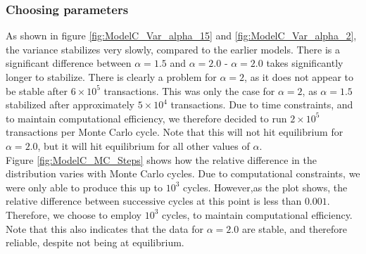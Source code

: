 \documentclass[a4paper, 10pt]{article}
\begin{document}
\subsubsection{Choosing parameters}
As shown in figure \ref{fig:ModelC_Var_alpha_15} and \ref{fig:ModelC_Var_alpha_2}, the variance stabilizes very slowly, compared to the earlier models. There is a significant difference between $\alpha=1.5$ and $\alpha=2.0$ - $\alpha=2.0$ takes significantly longer to stabilize. There is clearly a problem for $\alpha=2$, as it does not appear to be stable after $6\times 10^5$ transactions. This was only the case for $\alpha=2$, as $\alpha=1.5$ stabilized after approximately $5\times 10^4$ transactions. Due to time constraints, and to maintain computational efficiency, we therefore decided to run $2\times 10^5$ transactions per Monte Carlo cycle. Note that this will not hit equilibrium for $\alpha=2.0$, but it will hit equilibrium for all other values of $\alpha$.\\
\linebreak
Figure \ref{fig:ModelC_MC_Steps} shows how the relative difference in the distribution varies with Monte Carlo cycles. Due to computational constraints, we were only able to produce this up to $10^3$ cycles. However,as the plot shows, the relative difference between successive cycles at this point is less than $0.001$. Therefore, we choose to employ $10^3$ cycles, to maintain computational efficiency. Note that this also indicates that the data for $\alpha=2.0$ are stable, and therefore reliable, despite not being at equilibrium.
\end{document}
